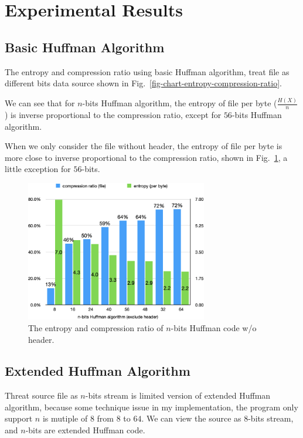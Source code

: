 \documentclass[a4paper,conference]{IEEEtran}
\begin{document}
\section{Experimental Results}

\subsection{Basic Huffman Algorithm}

The entropy and compression ratio using basic Huffman algorithm, treat file as different bits data source shown in Fig.~\ref{fig-chart-entropy-compression-ratio}.

We can see that for $n$-bits Huffman algorithm, the entropy of file per byte ($\frac{H(X)}{n}$) is inverse proportional to the compression ratio, except for $56$-bits Huffman algorithm.

When we only consider the file without header, the entropy of file per byte is more close to inverse proportional to the compression ratio, shown in Fig.~\ref{fig-chart-entropy-compression-ratio-exclude}, a little exception for $56$-bits.

\begin{figure}[htbp]
\centerline{\includegraphics[height=6.15cm, keepaspectratio,]{assets/chart-entropy-compression-ratio-asc-exclude.png}}
\caption{The entropy and compression ratio of $n$-bits Huffman code w/o header.}
\label{fig-chart-entropy-compression-ratio-exclude}
\end{figure}

\subsection{Extended Huffman Algorithm}

Threat source file as $n$-bits stream is limited version of extended Huffman algorithm, because some technique issue in my implementation, the program only support $n$ is mutiple of $8$ from $8$ to $64$. We can view the source as $8$-bits stream, and $n$-bits are extended Huffman code.
\end{document}
